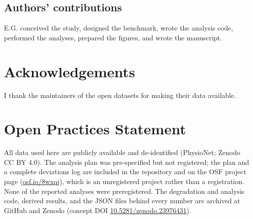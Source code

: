 \documentclass[11pt,a4paper]{article}
\begin{document}
\subsection*{Authors' contributions}
E.G. conceived the study, designed the benchmark, wrote the analysis code, performed the
analyses, prepared the figures, and wrote the manuscript.

\section*{Acknowledgements}
I thank the maintainers of the open datasets for making their data available.

\section*{Open Practices Statement}
All data used here are publicly available and de-identified (PhysioNet; Zenodo CC BY 4.0).
The analysis plan was pre-specified but not registered; the plan and a complete deviations
log are included in the repository and on the OSF project page
(\href{https://osf.io/8wxqj/}{osf.io/8wxqj}), which is an unregistered project rather than
a registration. None of the reported analyses were preregistered. The degradation and
analysis code, derived results, and the JSON files behind every number are archived at
GitHub and Zenodo (concept DOI
\href{https://doi.org/10.5281/zenodo.23976431}{10.5281/zenodo.23976431}).



\end{document}
